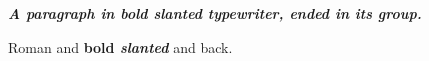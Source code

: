 \documentclass{article}
\begin{document}
{\ttfamily\slshape\bfseries A paragraph in bold slanted typewriter, ended in its group.\par}

Roman and {\ttfamily\bfseries bold \slshape slanted} and back.
\end{document}
